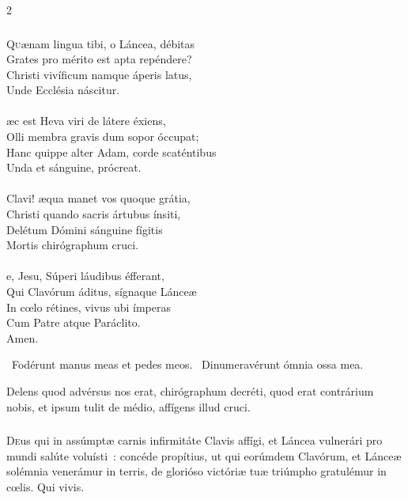 \documentclass[9pt,twoside]{extarticle}
\begin{document}
\begin{multicols}{2}
\subsubsection*{\center {}}
\lettrine{Q}uænam lingua tibi, o Láncea, débitas\\
Grates pro mérito est apta repéndere?\\
Christi vivíficum namque áperis latus,\\
Unde Ecclésia náscitur.\\
\\
æc est Heva viri de látere éxiens,\\
Olli membra gravis dum sopor óccupat;\\
Hanc quippe alter Adam, corde scaténtibus\\
Unda et sánguine, prócreat.\\
\\
 Clavi! æqua manet vos quoque grátia,\\
Christi quando sacris ártubus ínsiti,\\
Delétum Dómini sánguine fígitis\\
Mortis chirógraphum cruci.\\
\\
e, Jesu, Súperi láudibus éfferant,\\
Qui Clavórum áditus, sígnaque Lánceæ\\
In cœlo rétines, vivus ubi ímperas\\
Cum Patre atque Paráclito.\\
Amen.

\begin{tightlist}{}
\item {}~Fodérunt manus meas et pedes meos. ~Dinumeravérunt ómnia ossa mea.
\item {} Delens quod advérsus nos erat, chirógraphum decréti, quod erat contrárium nobis, et ipsum tulit de médio, affígens illud cruci.
\end{tightlist}

\subsubsection*{\center {}}
\lettrine{D}eus qui in assúmptæ carnis infirmitáte Clavis affígi, et Láncea vulnerári pro mundi salúte voluísti~: concéde propítius, ut qui eorúmdem Clavórum, et Lánceæ solémnia venerámur in terris, de glorióso victóriæ tuæ triúmpho gratulémur in cœlis. Qui vivis.


\end{multicols}
\end{document}
